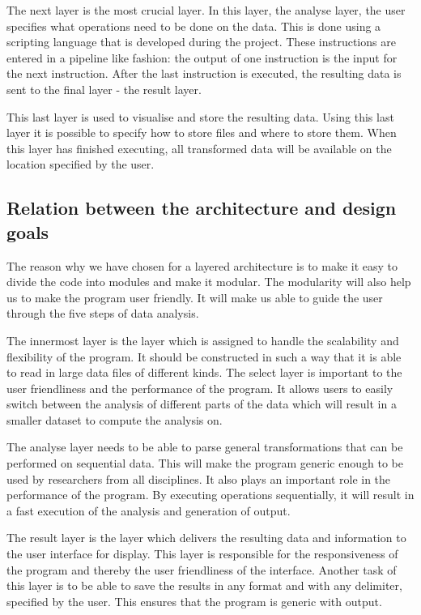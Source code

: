 \documentclass[a4paper,english,fleqn]{exam}
\begin{document}
The next layer is the most crucial layer. In this layer, the analyse layer, the user
specifies what operations need to be done on the data. This is done using a scripting language that is developed during the project. These instructions are entered in a pipeline like fashion: the output of one instruction is the input for the next instruction. After the last instruction is executed, the resulting data is sent to the final layer - the result layer.
 
This last layer is used to visualise and store the resulting data. Using this last layer it is possible to specify how to store files and where to store them. When this layer has finished executing, all transformed data will be available on the location specified by the user.

\subsection{Relation between the architecture and design goals}
The reason why we have chosen for a layered architecture is to make it easy to divide the code into modules and make it modular. The modularity will also help us to make the program user friendly. It will make us able to guide the user through the five steps of data analysis.
 
The innermost layer is the layer which is assigned to handle the scalability and flexibility of the program. It should be constructed in such a way that it is able to read in large data files of different kinds. The select layer is important to the user friendliness and the performance of the program. It allows users to easily switch between the analysis of different parts of the data which will result in a smaller dataset to compute the analysis on.
 
The analyse layer needs to be able to parse general transformations that can be performed on sequential data. This will make the program generic enough to be used by researchers from all disciplines. It also plays an important role in the performance of the program. By executing operations sequentially, it will result in a fast execution of the analysis and generation of output.
 
The result layer is the layer which delivers the resulting data and information to the user interface for display. This layer is responsible for the responsiveness of the program and thereby the user friendliness of the interface. Another task of this layer is to be able to save the results in any format and with any delimiter, specified by the user. This ensures that the program is generic with output.
\end{document}
